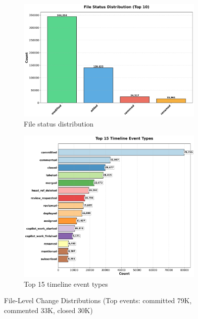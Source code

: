 \documentclass[11pt]{article}
\begin{document}
\begin{figure}[H]
\begin{subfigure}[b]{0.48\textwidth}
\centering
\includegraphics[width=\textwidth]{figures_individual/27_file_status_distribution.png}
\caption{File status distribution}
\label{fig:file_status}
\end{subfigure}
\hfill
\begin{subfigure}[b]{0.48\textwidth}
\centering
\includegraphics[width=\textwidth]{figures_individual/30_timeline_event_types_barplot.png}
\caption{Top 15 timeline event types}
\label{fig:event_types}
\end{subfigure}

\caption{File-Level Change Distributions (Top events: committed 79K, commented 33K, closed 30K)}
\label{fig:file_level_all}
\end{figure}
\end{document}
